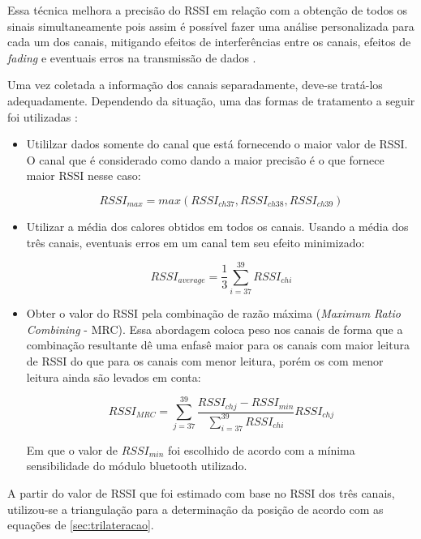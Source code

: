 Essa técnica melhora a precisão do RSSI em relação com a obtenção de todos os sinais simultaneamente pois assim é possível fazer uma análise personalizada para cada um dos canais, mitigando efeitos de interferências entre os canais, efeitos de \textit {fading} e eventuais erros na transmissão de dados \cite{art17}.

Uma vez coletada a informação dos canais separadamente, deve-se tratá-los adequadamente. Dependendo da situação, uma das formas de tratamento a seguir foi utilizadas :

\begin{itemize}

    \item Utililzar dados somente do canal que está fornecendo o maior valor de RSSI. O canal que é considerado como dando a maior precisão é o que fornece maior RSSI nesse caso:

    \begin{equation}
        RSSI_{max} = max(RSSI_{ch37}, RSSI_{ch38}, RSSI_{ch39})
    \end{equation}

    \item  Utilizar a média dos calores obtidos em todos os canais. Usando a média dos três canais, eventuais erros em um canal tem seu efeito minimizado:

    \begin{equation}
        RSSI_{average} = \frac{1}{3} \sum_{i=37}^{39}  RSSI_{ch i}
    \end{equation}


    \item Obter o valor do RSSI pela combinação de razão máxima (\textit{Maximum Ratio Combining} - MRC). Essa abordagem coloca peso nos canais de forma que a combinação resultante dê uma enfasê maior para os canais com maior leitura de RSSI do que para os canais com menor leitura, porém os com menor leitura ainda são levados em conta:

    \begin{equation}
        RSSI_{MRC} = \sum_{j=37}^{39} \frac{RSSI_{ch j} - RSSI_{min}}{\sum_{i=37}^{39}  RSSI_{ch i}} RSSI_{ch j}
    \end{equation}

    Em que o valor de \( RSSI_{min} \) foi escolhido de acordo com a mínima sensibilidade do módulo bluetooth utilizado.


\end{itemize}

A partir do valor de RSSI que foi estimado com base no RSSI dos três canais, utilizou-se a triangulação para a determinação da posição de acordo com as equações de \ref{sec:trilateracao}.

